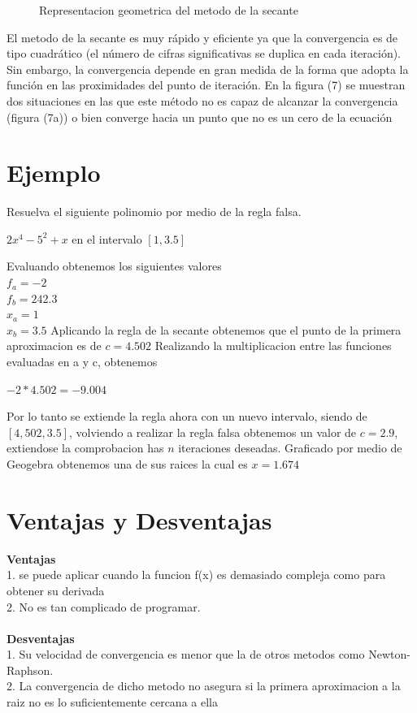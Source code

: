 \documentclass{article}
\begin{document}
\begin{multicols}{2}
\begin{figure}[H]
\caption{Representacion geometrica del metodo de la secante} 
\end{figure}
El metodo de la secante es muy rápido y eficiente ya que la convergencia es de tipo cuadrático (el número de cifras significativas se duplica en cada iteración). Sin embargo, la convergencia depende en gran medida de la forma que adopta la función en las proximidades del punto de iteración. En la figura (7) se muestran dos situaciones en las que este método no es capaz de alcanzar la convergencia (figura (7a)) o bien converge hacia un punto que no es un cero de la ecuación 
\section{Ejemplo}
\label{sec:Ejem}
Resuelva el siguiente polinomio por medio de la regla falsa.
\begin{center}
$2x^{4}-5^{2}+x $ en el intervalo $[1,3.5]$
\end{center}
Evaluando obtenemos los siguientes valores
\\
$f_{a}=-2$ 
\\
$f_{b}=242.3$
\\
$x_{a}=1$
\\
$x_{b}=3.5$
Aplicando la regla de la secante obtenemos que el punto de la primera aproximacion es de 
$c=4.502$
Realizando la multiplicacion entre las funciones evaluadas en a y c, obtenemos 
\begin{center}
$-2*4.502=-9.004$
\end{center}
Por lo tanto se extiende la regla ahora con un nuevo intervalo, siendo de $[4,502,3.5]$, volviendo a realizar la regla falsa obtenemos un valor de $c=2.9$, extiendose la comprobacion has $n$ iteraciones deseadas.
Graficado por medio de Geogebra obtenemos una de sus raices la cual es $x=1.674$

\section{Ventajas y Desventajas}
\textbf{Ventajas}
\\
1. se puede aplicar cuando la funcion f(x) es demasiado compleja como para obtener su derivada
\\
2. No es tan complicado de programar.
\\
\\
\textbf{Desventajas}
\\
1. Su velocidad de convergencia es menor que la de otros metodos como Newton-Raphson.
\\
2. La convergencia de dicho metodo no asegura si la primera aproximacion a la raiz no es lo suficientemente cercana a ella  

\end{multicols}
\end{document}
